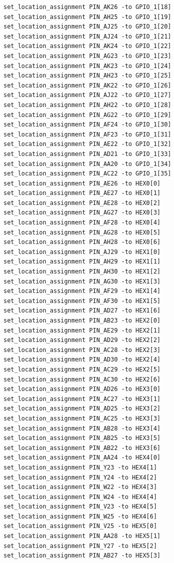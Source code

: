 \documentclass[conference]{IEEEtran}
\begin{document}
\begin{lstlisting}
set_location_assignment PIN_AK26 -to GPIO_1[18]
set_location_assignment PIN_AH25 -to GPIO_1[19]
set_location_assignment PIN_AJ25 -to GPIO_1[20]
set_location_assignment PIN_AJ24 -to GPIO_1[21]
set_location_assignment PIN_AK24 -to GPIO_1[22]
set_location_assignment PIN_AG23 -to GPIO_1[23]
set_location_assignment PIN_AK23 -to GPIO_1[24]
set_location_assignment PIN_AH23 -to GPIO_1[25]
set_location_assignment PIN_AK22 -to GPIO_1[26]
set_location_assignment PIN_AJ22 -to GPIO_1[27]
set_location_assignment PIN_AH22 -to GPIO_1[28]
set_location_assignment PIN_AG22 -to GPIO_1[29]
set_location_assignment PIN_AF24 -to GPIO_1[30]
set_location_assignment PIN_AF23 -to GPIO_1[31]
set_location_assignment PIN_AE22 -to GPIO_1[32]
set_location_assignment PIN_AD21 -to GPIO_1[33]
set_location_assignment PIN_AA20 -to GPIO_1[34]
set_location_assignment PIN_AC22 -to GPIO_1[35]
set_location_assignment PIN_AE26 -to HEX0[0]
set_location_assignment PIN_AE27 -to HEX0[1]
set_location_assignment PIN_AE28 -to HEX0[2]
set_location_assignment PIN_AG27 -to HEX0[3]
set_location_assignment PIN_AF28 -to HEX0[4]
set_location_assignment PIN_AG28 -to HEX0[5]
set_location_assignment PIN_AH28 -to HEX0[6]
set_location_assignment PIN_AJ29 -to HEX1[0]
set_location_assignment PIN_AH29 -to HEX1[1]
set_location_assignment PIN_AH30 -to HEX1[2]
set_location_assignment PIN_AG30 -to HEX1[3]
set_location_assignment PIN_AF29 -to HEX1[4]
set_location_assignment PIN_AF30 -to HEX1[5]
set_location_assignment PIN_AD27 -to HEX1[6]
set_location_assignment PIN_AB23 -to HEX2[0]
set_location_assignment PIN_AE29 -to HEX2[1]
set_location_assignment PIN_AD29 -to HEX2[2]
set_location_assignment PIN_AC28 -to HEX2[3]
set_location_assignment PIN_AD30 -to HEX2[4]
set_location_assignment PIN_AC29 -to HEX2[5]
set_location_assignment PIN_AC30 -to HEX2[6]
set_location_assignment PIN_AD26 -to HEX3[0]
set_location_assignment PIN_AC27 -to HEX3[1]
set_location_assignment PIN_AD25 -to HEX3[2]
set_location_assignment PIN_AC25 -to HEX3[3]
set_location_assignment PIN_AB28 -to HEX3[4]
set_location_assignment PIN_AB25 -to HEX3[5]
set_location_assignment PIN_AB22 -to HEX3[6]
set_location_assignment PIN_AA24 -to HEX4[0]
set_location_assignment PIN_Y23 -to HEX4[1]
set_location_assignment PIN_Y24 -to HEX4[2]
set_location_assignment PIN_W22 -to HEX4[3]
set_location_assignment PIN_W24 -to HEX4[4]
set_location_assignment PIN_V23 -to HEX4[5]
set_location_assignment PIN_W25 -to HEX4[6]
set_location_assignment PIN_V25 -to HEX5[0]
set_location_assignment PIN_AA28 -to HEX5[1]
set_location_assignment PIN_Y27 -to HEX5[2]
set_location_assignment PIN_AB27 -to HEX5[3]

\end{lstlisting}
\end{document}
